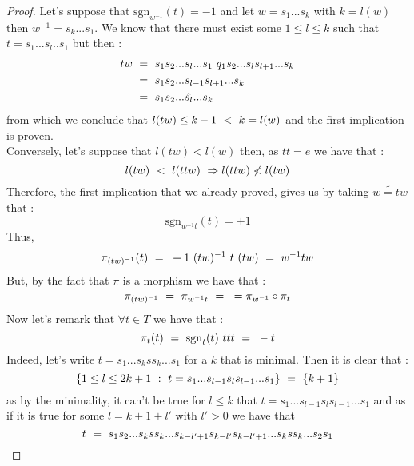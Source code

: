 \begin{proof}
	Let's suppose that $\mbox{sgn}_{w^{-1}}(t)=-1$ and let $w=s_1...s_k$ with $k=l(w)$ then $w^{-1}=s_k...s_1$. We know that there must exist some $1\leq l\leq k$ such that $t=s_1...s_l..s_1$ but then :
	\begin{equation}
	\begin{split}
	tw\text{ }&=\text{ } s_1s_2...s_l...s_1\text{ } q_1s_2...s_ls_{l+1}...s_k\\
	&=\text{ } s_1s_2...s_{l-1}s_{l+1}...s_k\\
	&=\text{ } s_1s_2...\hat{s_l}...s_k
	\end{split}
	\end{equation}
	from which we conclude that $l(tw)\leq k-1\text{ } <\text{ } k=l(w)$ and the first implication is proven.\\
	Conversely, let's suppose that $l(tw)<l(w)$ then, as $tt=e$ we have that :
	\begin{equation}
	l(tw)\text{ } <\text{ } l(ttw)\text{ } \Rightarrow l(ttw)\not<l(tw)
	\end{equation}
	Therefore, the first implication that we already proved, gives us by taking $\tilde{w=tw}$ that :
	\begin{equation}
	\mbox{sgn}_{w^{-1}t}(t)=+1
	\end{equation}
	Thus,
	\begin{equation}
	\pi_{(tw)^{-1}}(t)\text{ }=\text{ } +1 \text{ } (tw)^{-1}\text{ } t\text{ }(tw)\text{ }=\text{ } w^{-1}tw
	\end{equation}
	But, by the fact that $\pi$ is a morphism we have that :
	\begin{equation}\label{pi est un homo}
	\pi_{(tw)^{-1}}\text{ }=\text{ }\pi_{w^{-1}t}\text{ }=\text{ } =\pi_{w^{-1}}\circ\pi_t
	\end{equation}
	Now let's remark that $\forall t\in T$ we have that :
	\begin{equation}
	\pi_t(t)\text{ }=\text{ } \mbox{sgn}_t(t)\text{ } ttt\text{ }=\text{ } -t
	\end{equation}
	Indeed, let's write $t=s_1...s_kss_k...s_1$ for a $k$ that is minimal. Then it is clear that :
	\begin{equation}\label{le signe de t de t}
	\{1\leq l\leq 2k+1\text{ } :\text{ } t=s_1...s_{l-1}s_l s_{l-1}...s_1\}\text{ }=\text{ } \{k+1\}
	\end{equation}
	as by the minimality, it can't be true for $l\leq k$ that $t=s_1...s_{l-1}s_l s_{l-1}...s_1$ and as if it is true for some $l= k+1+l'$ with $l'>0$ we have that
	\begin{equation}
	t\text{ }=\text{ } s_1s_2...s_kss_k...s_{k-l'+1}s_{k-l'}s_{k-l'+1}...s_kss_k...s_2s_1
	\end{equation}

\end{proof}
